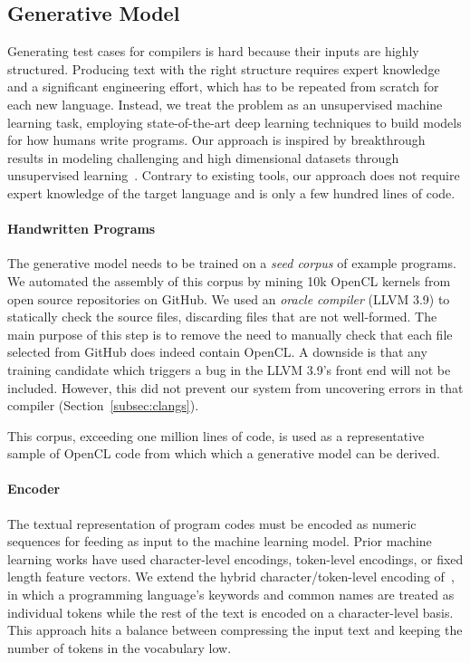 \subsection{Generative Model}

Generating test cases for compilers is hard because their inputs are highly structured. Producing text with the right structure requires expert knowledge and a significant engineering effort, which has to be repeated from scratch for each new language. Instead, we treat the problem as an unsupervised machine learning task, employing state-of-the-art deep learning techniques to build models for how humans write programs. Our approach is inspired by breakthrough results in modeling challenging and high dimensional datasets through unsupervised learning~\cite{Raghu2016,Radford2016b,Bowman2015}. Contrary to existing tools, our approach does not require expert knowledge of the target language and is only a few hundred lines of code.


\paragraph{Handwritten Programs} The generative model needs to be trained on a \emph{seed corpus} of example programs. We automated the assembly of this corpus by mining 10k OpenCL kernels from open source repositories on GitHub. We used an \emph{oracle compiler} (LLVM 3.9) to statically check the source files, discarding files that are not well-formed. The main purpose of this step is to remove the need to manually check that each file selected from GitHub does indeed contain OpenCL. A downside is that any training candidate which triggers a bug in the LLVM 3.9's front end will not be included. However, this did not prevent our system from uncovering errors in that compiler (Section~\ref{subsec:clangs}).

This corpus, exceeding one million lines of code, is used as a representative sample of OpenCL code from which which a generative model can be derived.

\paragraph{Encoder} The textual representation of program codes must be encoded as numeric sequences for feeding as input to the machine learning model. Prior machine learning works have used character-level encodings, token-level encodings, or fixed length feature vectors. We extend the hybrid character/token-level encoding of~\cite{Cummins2017b}, in which a programming language's keywords and common names are treated as individual tokens while the rest of the text is encoded on a character-level basis. This approach hits a balance between compressing the input text and keeping the number of tokens in the vocabulary low.

